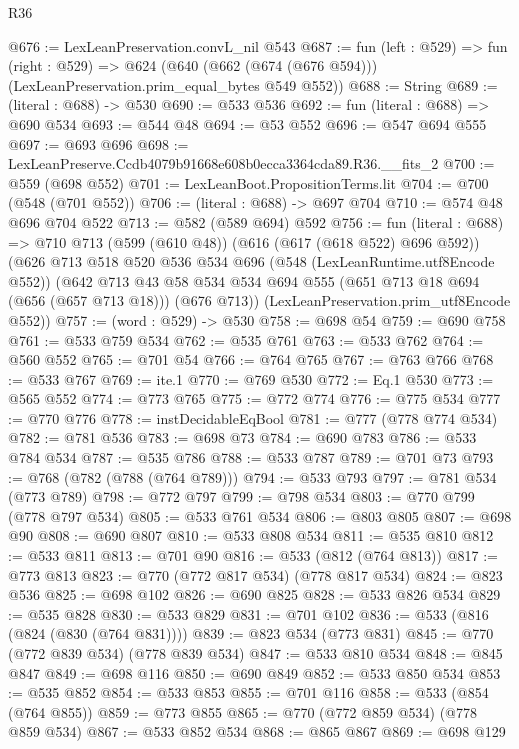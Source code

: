 \begin{lexlean}{R36}
\begin{coremodule}
@676 := LexLeanPreservation.convL_nil @543
@687 := fun (left : @529) =>
  fun (right : @529) =>
  @624 (@640 (@662 (@674 (@676 @594))) (LexLeanPreservation.prim_equal_bytes @549 @552))
@688 := String
@689 := (literal : @688) -> @530
@690 := @533 @536
@692 := fun (literal : @688) => @690 @534
@693 := @544 @48
@694 := @53 @552
@696 := @547 @694 @555
@697 := @693 @696
@698 := LexLeanPreserve.Ccdb4079b91668e608b0ecca3364cda89.R36.__fits_2
@700 := @559 (@698 @552)
@701 := LexLeanBoot.PropositionTerms.lit
@704 := @700 (@548 (@701 @552))
@706 := (literal : @688) -> @697 @704
@710 := @574 @48 @696 @704 @522
@713 := @582 (@589 @694) @592
@756 := fun (literal : @688) =>
  @710
    @713
    (@599 (@610 @48))
    (@616 (@617 (@618 @522) @696 @592))
    (@626
      @713
      @518
      @520
      @536
      @534
      @696
      (@548 (LexLeanRuntime.utf8Encode @552))
      (@642
        @713
        @43
        @58
        @534
        @534
        @694
        @555
        (@651 @713 @18 @694 (@656 (@657 @713 @18)))
        (@676 @713))
      (LexLeanPreservation.prim_utf8Encode @552))
@757 := (word : @529) -> @530
@758 := @698 @54
@759 := @690 @758
@761 := @533 @759 @534
@762 := @535 @761
@763 := @533 @762
@764 := @560 @552
@765 := @701 @54
@766 := @764 @765
@767 := @763 @766
@768 := @533 @767
@769 := ite.{1}
@770 := @769 @530
@772 := Eq.{1} @530
@773 := @565 @552
@774 := @773 @765
@775 := @772 @774
@776 := @775 @534
@777 := @770 @776
@778 := instDecidableEqBool
@781 := @777 (@778 @774 @534)
@782 := @781 @536
@783 := @698 @73
@784 := @690 @783
@786 := @533 @784 @534
@787 := @535 @786
@788 := @533 @787
@789 := @701 @73
@793 := @768 (@782 (@788 (@764 @789)))
@794 := @533 @793
@797 := @781 @534 (@773 @789)
@798 := @772 @797
@799 := @798 @534
@803 := @770 @799 (@778 @797 @534)
@805 := @533 @761 @534
@806 := @803 @805
@807 := @698 @90
@808 := @690 @807
@810 := @533 @808 @534
@811 := @535 @810
@812 := @533 @811
@813 := @701 @90
@816 := @533 (@812 (@764 @813))
@817 := @773 @813
@823 := @770 (@772 @817 @534) (@778 @817 @534)
@824 := @823 @536
@825 := @698 @102
@826 := @690 @825
@828 := @533 @826 @534
@829 := @535 @828
@830 := @533 @829
@831 := @701 @102
@836 := @533 (@816 (@824 (@830 (@764 @831))))
@839 := @823 @534 (@773 @831)
@845 := @770 (@772 @839 @534) (@778 @839 @534)
@847 := @533 @810 @534
@848 := @845 @847
@849 := @698 @116
@850 := @690 @849
@852 := @533 @850 @534
@853 := @535 @852
@854 := @533 @853
@855 := @701 @116
@858 := @533 (@854 (@764 @855))
@859 := @773 @855
@865 := @770 (@772 @859 @534) (@778 @859 @534)
@867 := @533 @852 @534
@868 := @865 @867
@869 := @698 @129

\end{coremodule}
\end{lexlean}
